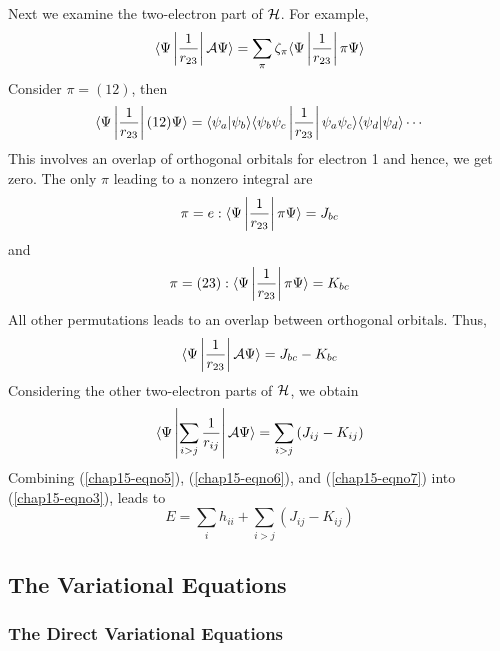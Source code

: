 Next we examine the two-electron part of ${\cal H}$.  For example,
\begin{equation}
\langle \Psi \left| {1 \over r_{23}} \right| {\cal A} \Psi \rangle = 
\sum_{\pi} \zeta_{\pi} \langle \Psi \left| {1 \over r_{23}} \right| \pi 
\Psi \rangle
\end{equation}
Consider $\pi = (12)$, then
\begin{equation}
\langle \Psi \left| {1 \over r_{23}} \right| (12) \Psi \rangle = 
\langle \psi_a | \psi_b \rangle \langle  \psi_b \psi_c \left| {1 \over 
r_{23}} \right| \psi_a \psi_c \rangle \langle \psi_d | \psi_d \rangle 
\cdots
\end{equation}
This involves an overlap of orthogonal orbitals for electron 1 and hence, we
get zero.  The only $\pi$ leading to a nonzero integral are
\begin{equation}
\pi = e : \langle \Psi \left| {1 \over r_{23}} \right| \pi \Psi 
\rangle = J_{bc}
\end{equation}
and
\begin{equation}
\pi = (23) : \langle \Psi \left| {1 \over r_{23}} \right| \pi \Psi 
\rangle = K_{bc}
\end{equation}
All other permutations leads to an overlap between orthogonal orbitals.
Thus,
\begin{equation}
\langle \Psi \left| {1 \over r_{23}} \right| {\cal A} \Psi \rangle = 
J_{bc} - K_{bc}
\end{equation}
Considering the other two-electron parts of ${\cal H}$, we obtain
\begin{equation}
\langle \Psi \left| \sum_{i>j} {1 \over r_{ij}} \right| {\cal A} \Psi 
\rangle = \sum_{i>j} \left( J_{ij} - K_{ij} \right)
\label{chap15-eqno7}
\end{equation}
Combining (\ref{chap15-eqno5}), (\ref{chap15-eqno6}), and
(\ref{chap15-eqno7}) into (\ref{chap15-eqno3}), leads to
\begin{equation}
E = \sum_{i} h_{ii} + \sum_{i>j} \left( J_{ij} - K_{ij} 
\right)
\label{chap15-eqno8}
\end{equation}

\subsection{The Variational Equations}

\subsubsection{The Direct Variational Equations}

